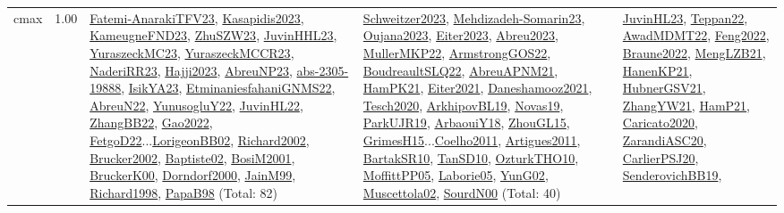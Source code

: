 {\begin{longtable}{p{3cm}r>{\raggedright\arraybackslash}p{6cm}>{\raggedright\arraybackslash}p{6cm}>{\raggedright\arraybackslash}p{8cm}}
\index{cmax}\index{Concepts!cmax}cmax &  1.00 & \hyperref[detail:Fatemi-AnarakiTFV23]{Fatemi-AnarakiTFV23}, \hyperref[detail:Kasapidis2023]{Kasapidis2023}, \hyperref[detail:KameugneFND23]{KameugneFND23}, \hyperref[detail:ZhuSZW23]{ZhuSZW23}, \hyperref[detail:JuvinHHL23]{JuvinHHL23}, \hyperref[detail:YuraszeckMC23]{YuraszeckMC23}, \hyperref[detail:YuraszeckMCCR23]{YuraszeckMCCR23}, \hyperref[detail:NaderiRR23]{NaderiRR23}, \hyperref[detail:Hajji2023]{Hajji2023}, \hyperref[detail:AbreuNP23]{AbreuNP23}, \hyperref[detail:abs-2305-19888]{abs-2305-19888}, \hyperref[detail:IsikYA23]{IsikYA23}, \hyperref[detail:EtminaniesfahaniGNMS22]{EtminaniesfahaniGNMS22}, \hyperref[detail:AbreuN22]{AbreuN22}, \hyperref[detail:YunusogluY22]{YunusogluY22}, \hyperref[detail:JuvinHL22]{JuvinHL22}, \hyperref[detail:ZhangBB22]{ZhangBB22}, \hyperref[detail:Gao2022]{Gao2022}, \hyperref[detail:FetgoD22]{FetgoD22}...\hyperref[detail:LorigeonBB02]{LorigeonBB02}, \hyperref[detail:Richard2002]{Richard2002}, \hyperref[detail:Brucker2002]{Brucker2002}, \hyperref[detail:Baptiste02]{Baptiste02}, \hyperref[detail:BosiM2001]{BosiM2001}, \hyperref[detail:BruckerK00]{BruckerK00}, \hyperref[detail:Dorndorf2000]{Dorndorf2000}, \hyperref[detail:JainM99]{JainM99}, \hyperref[detail:Richard1998]{Richard1998}, \hyperref[detail:PapaB98]{PapaB98} (Total: 82) & \hyperref[detail:Schweitzer2023]{Schweitzer2023}, \hyperref[detail:Mehdizadeh-Somarin23]{Mehdizadeh-Somarin23}, \hyperref[detail:Oujana2023]{Oujana2023}, \hyperref[detail:Eiter2023]{Eiter2023}, \hyperref[detail:Abreu2023]{Abreu2023}, \hyperref[detail:MullerMKP22]{MullerMKP22}, \hyperref[detail:ArmstrongGOS22]{ArmstrongGOS22}, \hyperref[detail:BoudreaultSLQ22]{BoudreaultSLQ22}, \hyperref[detail:AbreuAPNM21]{AbreuAPNM21}, \hyperref[detail:HamPK21]{HamPK21}, \hyperref[detail:Eiter2021]{Eiter2021}, \hyperref[detail:Daneshamooz2021]{Daneshamooz2021}, \hyperref[detail:Tesch2020]{Tesch2020}, \hyperref[detail:ArkhipovBL19]{ArkhipovBL19}, \hyperref[detail:Novas19]{Novas19}, \hyperref[detail:ParkUJR19]{ParkUJR19}, \hyperref[detail:ArbaouiY18]{ArbaouiY18}, \hyperref[detail:ZhouGL15]{ZhouGL15}, \hyperref[detail:GrimesH15]{GrimesH15}...\hyperref[detail:Coelho2011]{Coelho2011}, \hyperref[detail:Artigues2011]{Artigues2011}, \hyperref[detail:BartakSR10]{BartakSR10}, \hyperref[detail:TanSD10]{TanSD10}, \hyperref[detail:OzturkTHO10]{OzturkTHO10}, \hyperref[detail:MoffittPP05]{MoffittPP05}, \hyperref[detail:Laborie05]{Laborie05}, \hyperref[detail:YunG02]{YunG02}, \hyperref[detail:Muscettola02]{Muscettola02}, \hyperref[detail:SourdN00]{SourdN00} (Total: 40) & \hyperref[detail:JuvinHL23]{JuvinHL23}, \hyperref[detail:Teppan22]{Teppan22}, \hyperref[detail:AwadMDMT22]{AwadMDMT22}, \hyperref[detail:Feng2022]{Feng2022}, \hyperref[detail:Braune2022]{Braune2022}, \hyperref[detail:MengLZB21]{MengLZB21}, \hyperref[detail:HanenKP21]{HanenKP21}, \hyperref[detail:HubnerGSV21]{HubnerGSV21}, \hyperref[detail:ZhangYW21]{ZhangYW21}, \hyperref[detail:HamP21]{HamP21}, \hyperref[detail:Caricato2020]{Caricato2020}, \hyperref[detail:ZarandiASC20]{ZarandiASC20}, \hyperref[detail:CarlierPSJ20]{CarlierPSJ20}, \hyperref[detail:SenderovichBB19]{SenderovichBB19}, 
\end{longtable}}
